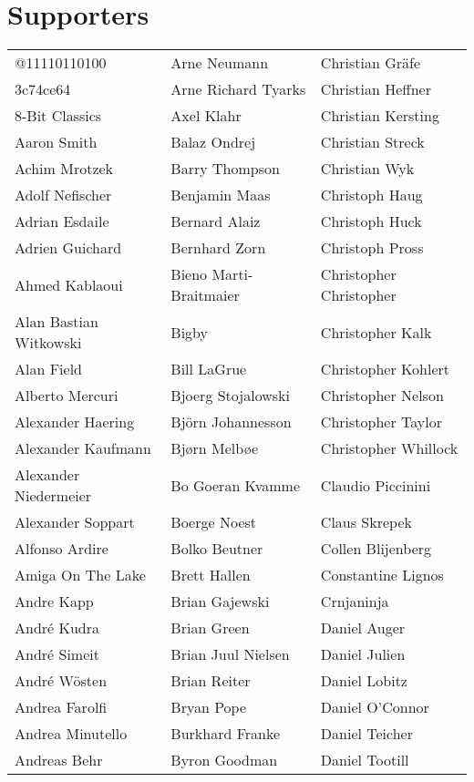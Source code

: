 \newpage
\section{Supporters}

\setlength{\tabcolsep}{1mm}
\begin{tabular}{p{4.5cm}p{4.5cm}p{4.5cm}}
@11110110100 & Arne Neumann & Christian Gräfe \\
3c74ce64 & Arne Richard Tyarks & Christian Heffner \\
8-Bit Classics & Axel Klahr & Christian Kersting \\
Aaron Smith & Balaz Ondrej & Christian Streck \\
Achim Mrotzek & Barry Thompson & Christian Wyk \\
Adolf Nefischer & Benjamin Maas & Christoph Haug \\
Adrian Esdaile & Bernard Alaiz & Christoph Huck \\
Adrien Guichard & Bernhard Zorn & Christoph Pross \\
Ahmed Kablaoui & Bieno Marti-Braitmaier & Christopher Christopher \\
Alan Bastian Witkowski & Bigby & Christopher Kalk \\
Alan Field & Bill LaGrue & Christopher Kohlert \\
Alberto Mercuri & Bjoerg Stojalowski & Christopher Nelson \\
Alexander Haering & Björn Johannesson & Christopher Taylor \\
Alexander Kaufmann & Bjørn Melbøe & Christopher Whillock \\
Alexander Niedermeier & Bo Goeran Kvamme & Claudio Piccinini \\
Alexander Soppart & Boerge Noest & Claus Skrepek \\
Alfonso Ardire & Bolko Beutner & Collen Blijenberg \\
Amiga On The Lake & Brett Hallen & Constantine Lignos \\
Andre Kapp & Brian Gajewski & Crnjaninja \\
André Kudra & Brian Green & Daniel Auger \\
André Simeit & Brian Juul Nielsen & Daniel Julien \\
André Wösten & Brian Reiter & Daniel Lobitz \\
Andrea Farolfi & Bryan Pope & Daniel O'Connor \\
Andrea Minutello & Burkhard Franke & Daniel Teicher \\
Andreas Behr & Byron Goodman & Daniel Tootill \\

\end{tabular}

